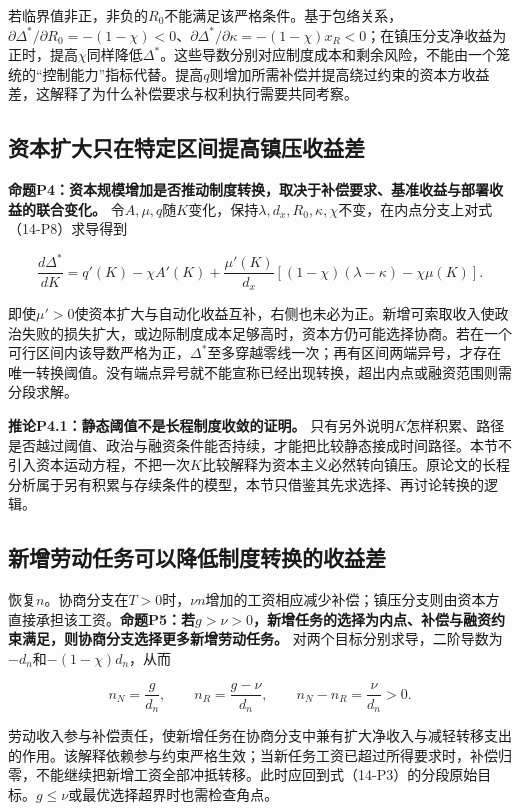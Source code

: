 \documentclass[UTF8,fontset=windows,12pt,a4paper,oneside,openany]{ctexbook}
\begin{document}
若临界值非正，非负的$R_0$不能满足该严格条件。基于包络关系，$\partial\Delta^*/\partial R_0=-(1-\chi)<0$、$\partial\Delta^*/\partial\kappa=-(1-\chi)x_R<0$；在镇压分支净收益为正时，提高$\chi$同样降低$\Delta^*$。这些导数分别对应制度成本和剩余风险，不能由一个笼统的“控制能力”指标代替。提高$q$则增加所需补偿并提高绕过约束的资本方收益差，这解释了为什么补偿要求与权利执行需要共同考察。

\subsection{资本扩大只在特定区间提高镇压收益差}

\textbf{命题P4：资本规模增加是否推动制度转换，取决于补偿要求、基准收益与部署收益的联合变化。} 令$A,\mu,q$随$K$变化，保持$\lambda,d_x,R_0,\kappa,\chi$不变，在内点分支上对式（14-P8）求导得到

\[
\frac{d\Delta^*}{dK}=q'(K)-\chi A'(K)
 +\frac{\mu'(K)}{d_x}
 \left[(1-\chi)(\lambda-\kappa)-\chi\mu(K)\right].
\tag{14-P10}
\]

即使$\mu'>0$使资本扩大与自动化收益互补，右侧也未必为正。新增可索取收入使政治失败的损失扩大，或边际制度成本足够高时，资本方仍可能选择协商。若在一个可行区间内该导数严格为正，$\Delta^*$至多穿越零线一次；再有区间两端异号，才存在唯一转换阈值。没有端点异号就不能宣称已经出现转换，超出内点或融资范围则需分段求解。

\textbf{推论P4.1：静态阈值不是长程制度收敛的证明。} 只有另外说明$K$怎样积累、路径是否越过阈值、政治与融资条件能否持续，才能把比较静态接成时间路径。本节不引入资本运动方程，不把一次$K$比较解释为资本主义必然转向镇压。原论文的长程分析属于另有积累与存续条件的模型，本节只借鉴其先求选择、再讨论转换的逻辑。

\subsection{新增劳动任务可以降低制度转换的收益差}

恢复$n$。协商分支在$T>0$时，$\nu n$增加的工资相应减少补偿；镇压分支则由资本方直接承担该工资。\textbf{命题P5：若$g>\nu>0$，新增任务的选择为内点、补偿与融资约束满足，则协商分支选择更多新增劳动任务。} 对两个目标分别求导，二阶导数为$-d_n$和$-(1-\chi)d_n$，从而

\[
n_N=\frac{g}{d_n},\qquad n_R=\frac{g-\nu}{d_n},\qquad
n_N-n_R=\frac{\nu}{d_n}>0.
\tag{14-P11}
\]

劳动收入参与补偿责任，使新增任务在协商分支中兼有扩大净收入与减轻转移支出的作用。该解释依赖参与约束严格生效；当新任务工资已超过所得要求时，补偿归零，不能继续把新增工资全部冲抵转移。此时应回到式（14-P3）的分段原始目标。$g\leq\nu$或最优选择超界时也需检查角点。
\end{document}
